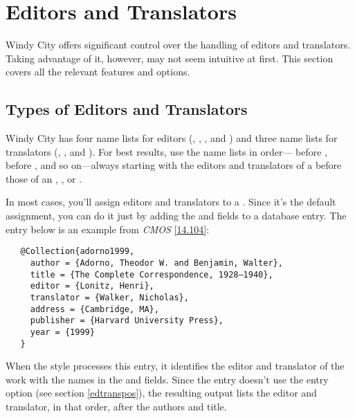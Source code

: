 \documentclass[11pt,letterpaper,oneside]{article}
\begin{document}
\section{Editors and Translators}
\label{edtrans}

Windy City offers significant control over the handling of editors and
translators. Taking advantage of it, however, may not seem intuitive
at first. This section covers all the relevant features and options.

\subsection{Types of Editors and Translators}
\label{edtransnames}

Windy City has four name lists for editors (,
, , and ) and
three name lists for translators (,
, and ). For best results,
use the name lists in order--- before
,  before
, and so on---always starting with the editors
and translators of a  before those of an
, , or .

In most cases, you'll assign editors and translators to a
. Since it's the default assignment, you can do it
just by adding the  and  fields
to a database entry. The entry below is an example from \textit{CMOS}
\ref{14.104}:

\begin{verbatim}
   @Collection{adorno1999,
     author = {Adorno, Theodor W. and Benjamin, Walter},
     title = {The Complete Correspondence, 1928–1940},
     editor = {Lonitz, Henri},
     translator = {Walker, Nicholas},
     address = {Cambridge, MA},
     publisher = {Harvard University Press},
     year = {1999}
   }
\end{verbatim}

\begin{citebib}
\item \cite{adorno1999}
\end{citebib}

\noindent When the style processes this entry, it identifies the
editor and translator of the work with the names in the
 and  fields. Since the entry
doesn't use the  entry option (see section
\ref{edtranspos}), the resulting output lists the editor and
translator, in that order, after the authors and title.
\end{document}
